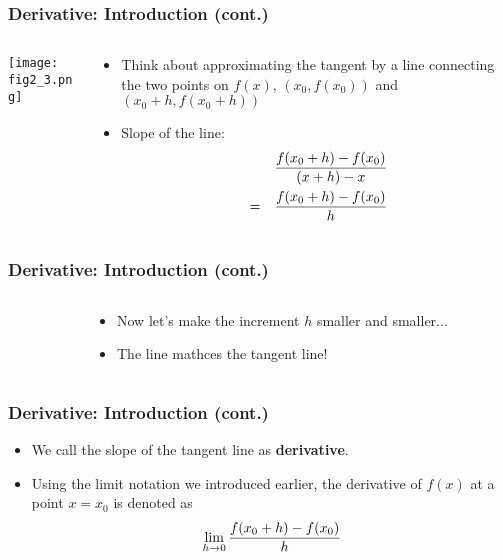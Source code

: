 \documentclass[pdflatex, 12pt]{beamer}
\begin{document}
\begin{frame}
\frametitle{Derivative: Introduction (cont.)}
\begin{columns}
\begin{column}{0.5\textwidth}
\centering
\texttt{[image: fig2\_3.png]}
\end{column}
\begin{column}{0.5\textwidth}
\begin{itemize}
\item Think about approximating the tangent by a line connecting the two points on $f(x)$, $(x_0, f(x_0))$ and $(x_0 + h, f(x_0 + h))$
\vspace{0.4cm}
\item Slope of the line:
 \begin{eqnarray}
 && \frac{f(x_0 + h) - f(x_0)}{(x + h) - x} \notag \\
 &=& \frac{f(x_0 + h) - f(x_0)}{h} \notag 
 \end{eqnarray}
\end{itemize}
\end{column}
\end{columns}
\end{frame}

\begin{frame}
\frametitle{Derivative: Introduction (cont.)}
\begin{columns}
\begin{column}{0.5\textwidth}
\centering
{}
\end{column}
\begin{column}{0.5\textwidth}
\begin{itemize}
\item Now let's make the increment $h$ smaller and smaller...
\vspace{0.4cm}
\item The line mathces the tangent line!
\end{itemize}
\end{column}
\end{columns}
\end{frame}

\begin{frame}
\frametitle{Derivative: Introduction (cont.)}
\begin{itemize}
\item We call the slope of the tangent line as \textbf{derivative}.
\vspace{0.4cm}
\item Using the limit notation we introduced earlier, the derivative of $f(x)$ at a point $x = x_0$ is denoted as
 \begin{equation}
 \lim_{h \to 0} \frac{f(x_0 + h) - f(x_0)}{h} \notag
 \end{equation}
\end{itemize}
\end{frame}
\end{document}
